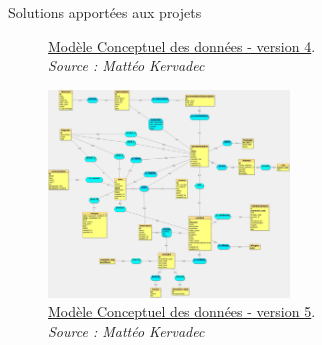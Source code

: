 \documentclass{beamer}
\begin{document}
\begin{frame}[label=realisation]{Solutions apportées aux projets}
\begin{center}
{\begin{figure}[t]
				\caption{	
					\centering			
  					\href{https://github.com/Matteo-K/Soutenance_E-delic/blob/main/img/conception/mcd_V4.jpg}{\underline{Modèle Conceptuel des données - version 4}}.\\
  					\textit{Source : Mattéo Kervadec}
				}
  				\label{fig:mcdV4}
  			\end{figure}
		}
		 {
			\addtocounter{figure}{4}
			\begin{figure}[t]
  				\includegraphics[height=5.5cm]{../img/conception/mcd_V5.jpg}
				\caption{	
					\centering			
  					\href{https://github.com/Matteo-K/Soutenance_E-delic/blob/main/img/conception/mcd_V5.jpg}{\underline{Modèle Conceptuel des données - version 5}}.\\
  					\textit{Source : Mattéo Kervadec}
				}
  				\label{fig:mcdV5}
  			\end{figure}
		}
	\end{center}
	\vfill
\end{frame}
\end{document}
